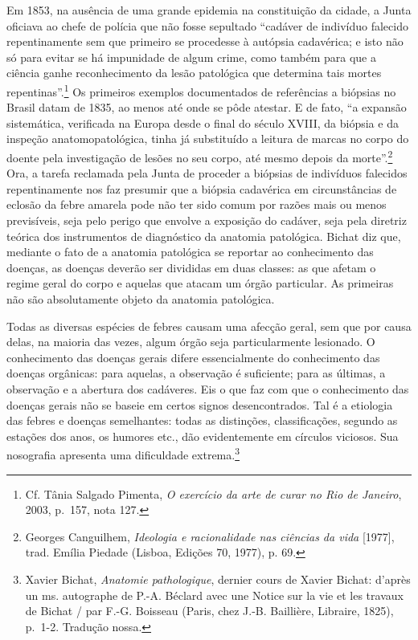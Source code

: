 Em 1853, na ausência de uma grande epidemia na constituição da cidade, a
Junta oficiava ao chefe de polícia que não fosse sepultado ``cadáver de
indivíduo falecido repentinamente sem que primeiro se procedesse à
autópsia cadavérica; e isto não só para evitar se há impunidade de algum
crime, como também para que a ciência ganhe reconhecimento da lesão
patológica que determina tais mortes repentinas''.\footnote{Cf. Tânia
  Salgado Pimenta, \emph{O exercício da arte de curar no Rio de
  Janeiro}, 2003, p.~157, nota 127.} Os primeiros exemplos documentados
de referências a biópsias no Brasil datam de 1835, ao menos até onde se
pôde atestar. E de fato, ``a expansão sistemática, verificada na Europa
desde o final do século XVIII, da biópsia e da inspeção
anatomopatológica, tinha já substituído a leitura de marcas no corpo do
doente pela investigação de lesões no seu corpo, até mesmo depois da
morte''.\footnote{Georges Canguilhem, \emph{Ideologia e racionalidade
  nas ciências da vida} {[}1977{]}, trad. Emília Piedade (Lisboa,
  Edições 70, 1977), p. 69.} Ora, a tarefa reclamada pela Junta de
proceder a biópsias de indivíduos falecidos repentinamente nos faz
presumir que a biópsia cadavérica em circunstâncias de eclosão da febre
amarela pode não ter sido comum por razões mais ou menos previsíveis,
seja pelo perigo que envolve a exposição do cadáver, seja pela diretriz
teórica dos instrumentos de diagnóstico da anatomia patológica. Bichat
diz que, mediante o fato de a anatomia patológica se reportar ao
conhecimento das doenças, as doenças deverão ser divididas em duas
classes: as que afetam o regime geral do corpo e aquelas que atacam um
órgão particular. As primeiras não são absolutamente objeto da anatomia
patológica.

Todas as diversas espécies de febres causam uma afecção geral, sem que
por causa delas, na maioria das vezes, algum órgão seja particularmente
lesionado. O conhecimento das doenças gerais difere essencialmente do
conhecimento das doenças orgânicas: para aquelas, a observação é
suficiente; para as últimas, a observação e a abertura dos cadáveres.
Eis o que faz com que o conhecimento das doenças gerais não se baseie em
certos signos desencontrados. Tal é a etiologia das febres e doenças
semelhantes: todas as distinções, classificações, segundo as estações
dos anos, os humores etc., dão evidentemente em círculos viciosos. Sua
nosografia apresenta uma dificuldade extrema.\footnote{Xavier Bichat,
  \emph{Anatomie pathologique}, dernier cours de Xavier Bichat: d'après
  un ms. autographe de P.-A. Béclard avec une Notice sur la vie et les
  travaux de Bichat / par F.-G. Boisseau (Paris, chez J.-B. Baillière,
  Libraire, 1825), p.~1-2. Tradução nossa.}

